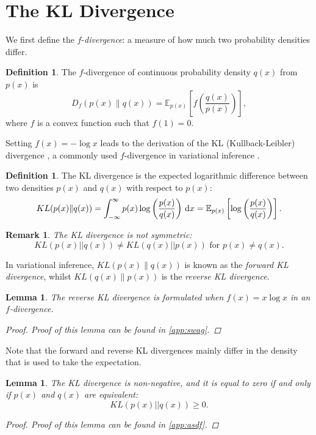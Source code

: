 \documentclass[honours,12pt, twoside]{unswthesis}
\newtheorem{lemma}[theorem]{Lemma}
\newtheorem{remark}[theorem]{Remark}
\numberwithin{equation}{section}
\theoremstyle{definition}
\newtheorem{definition}[theorem]{Definition}
\begin{document}
\section{The KL Divergence}\label{sec:3.2}
We first define the $f$-\textit{divergence}: a measure of how much two probability densities differ.
\begin{definition}\label{def:3.2.1}
The $f$-divergence of continuous probability density $q(x)$ from $p(x)$ is
\[D_f(p(x)\|q(x))=\mathbb{E}_{p(x)}\left[f\left(\frac{q(x)}{p(x)}\right)\right],\]
where $f$ is a convex function such that $f(1)=0$.
\end{definition}
Setting $f(x)=-\log x$ leads to the derivation of the KL (Kullback-Leibler) divergence \citep{KL}, a commonly used $f$-divergence in variational inference \citep{blei}.
\begin{definition}
The KL divergence is the expected logarithmic difference between two densities $p(x)$ and $q(x)$ with respect to $p(x)$:
\begin{equation*}
KL(p(x)\|q(x))=\int_{-\infty}^\infty p(x)\log \left(\frac{p(x)}{q(x)}\right)\, {\rm d}x=\mathbb{E}_{p(x)}\left[\log\left(\frac{p(x)}{q(x)}\right)\right].
\end{equation*}
\end{definition}
\begin{remark}
The KL divergence is not symmetric:
\begin{equation*}
KL(p(x)||q(x))\neq KL(q(x)||p(x))\text{ for }p(x)\neq q(x).
\end{equation*}
\end{remark}
In variational inference, $KL(p(x)\|q(x))$ is known as the \textit{forward KL divergence}, whilst $KL(q(x)\|p(x))$ is the \textit{reverse KL divergence}.
\begin{lemma}
The reverse KL divergence is formulated when $f(x)=x\log x$ in an $f$-divergence.
\begin{proof}
Proof of this lemma can be found in \autoref{app:swag}.
\end{proof}
\end{lemma}
Note that the forward and reverse KL divergences mainly differ in the density that is used to take the expectation.
\begin{lemma}\label{3.2.5}
The KL divergence is non-negative, and it is equal to zero if and only if $p(x)$ and $q(x)$ are equivalent:
\begin{equation*}
KL(p(x)||q(x))\geq 0.
\end{equation*}
\begin{proof}
Proof of this lemma can be found in \autoref{app:asdf}.
\end{proof}
\end{lemma}
\end{document}
